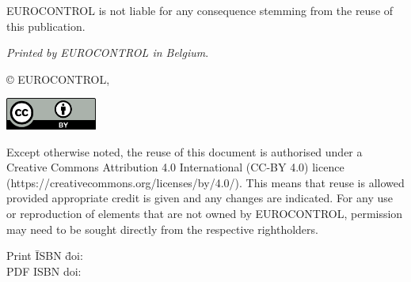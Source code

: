 \thispagestyle{empty}

\vspace*{\fill}

\textsc{EUROCONTROL} is not liable for any consequence stemming from the reuse of this publication.
\vspace*{2cm}

\textsl{Printed by EUROCONTROL in Belgium}.

© \textsc{EUROCONTROL}, \thecopyrightyear

\vspace*{1cm}

\includegraphics[width=3cm]{media/creative_commons_by.png}

Except otherwise noted, the reuse of this document is authorised under a
Creative Commons Attribution 4.0 International (CC-BY 4.0) licence
(https://creativecommons.org/licenses/by/4.0/). This means that reuse is allowed provided appropriate credit is given and any changes are indicated.
For any use or reproduction of elements that are not owned by \textsc{EUROCONTROL}, permission may need to be sought directly from the respective rightholders.


\begin{tabbing}
Print \hspace{1cm}\= ISBN \theISBNprint \hspace{1cm}\= doi:\theDOIprint\\
PDF	\> ISBN \theISBNpdf \> doi:\theDOIpdf

\end{tabbing}

\restoregeometry
